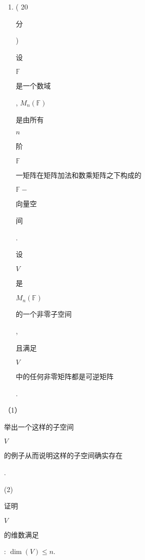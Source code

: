 \documentclass[10pt]{article}
\begin{document}
\begin{enumerate}
  \item ( 20 \begin{CJK}{UTF8}{mj}分\end{CJK}) \begin{CJK}{UTF8}{mj}设\end{CJK} $\mathbb{F}$ \begin{CJK}{UTF8}{mj}是一个数域\end{CJK}, $M_{n}(\mathbb{F})$ \begin{CJK}{UTF8}{mj}是由所有\end{CJK} $n$ \begin{CJK}{UTF8}{mj}阶\end{CJK} $\mathbb{F}$ \begin{CJK}{UTF8}{mj}一矩阵在矩阵加法和数乘矩阵之下构成的\end{CJK} $\mathbb{F}-$ \begin{CJK}{UTF8}{mj}向量空\end{CJK} \begin{CJK}{UTF8}{mj}间\end{CJK}. \begin{CJK}{UTF8}{mj}设\end{CJK} $V$ \begin{CJK}{UTF8}{mj}是\end{CJK} $M_{n}(\mathbb{F})$ \begin{CJK}{UTF8}{mj}的一个非零子空间\end{CJK}, \begin{CJK}{UTF8}{mj}且满足\end{CJK} $V$ \begin{CJK}{UTF8}{mj}中的任何非零矩阵都是可逆矩阵\end{CJK}.

\end{enumerate}
（1）\begin{CJK}{UTF8}{mj}举出一个这样的子空间\end{CJK} $V$ \begin{CJK}{UTF8}{mj}的例子从而说明这样的子空间确实存在\end{CJK}.

(2) \begin{CJK}{UTF8}{mj}证明\end{CJK} $V$ \begin{CJK}{UTF8}{mj}的维数满足\end{CJK}: $\operatorname{dim}(V) \leqslant n$.
\end{document}
